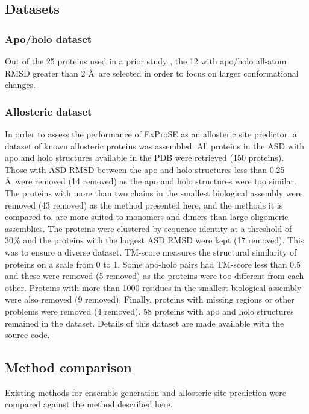\subsection{Datasets}

\subsubsection{Apo/holo dataset}

Out of the 25 proteins used in a prior study \cite{Atilgan2010}, the 12 with apo/holo all-atom RMSD greater than 2 \AA\ are selected in order to focus on larger conformational changes.


\subsubsection{Allosteric dataset}

In order to assess the performance of ExProSE as an allosteric site predictor, a dataset of known allosteric proteins was assembled.
All proteins in the ASD with apo and holo structures available in the PDB were retrieved (150 proteins).
Those with ASD RMSD between the apo and holo structures less than 0.25 \AA\ were removed (14 removed) as the apo and holo structures were too similar.
The proteins with more than two chains in the smallest biological assembly were removed (43 removed) as the method presented here, and the methods it is compared to, are more suited to monomers and dimers than large oligomeric assemblies.
The proteins were clustered by sequence identity at a threshold of 30\% and the proteins with the largest ASD RMSD were kept (17 removed).
This was to ensure a diverse dataset.
TM-score measures the structural similarity of proteins on a scale from 0 to 1.
Some apo-holo pairs had TM-score less than 0.5 and these were removed (5 removed) as the proteins were too different from each other.
Proteins with more than 1000 residues in the smallest biological assembly were also removed (9 removed).
Finally, proteins with missing regions or other problems were removed (4 removed).
58 proteins with apo and holo structures remained in the dataset.
Details of this dataset are made available with the source code.


\subsection{Method comparison}

Existing methods for ensemble generation and allosteric site prediction were compared against the method described here.



